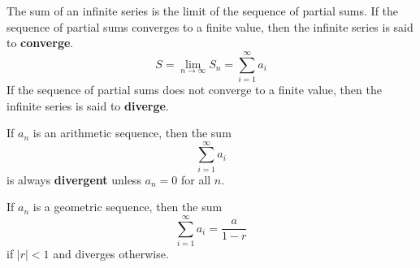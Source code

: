 \documentclass[addpoints]{exam}
\begin{document}
\begin{tcolorbox}[title=Definition: \textit{Sum of an Infinite Series},title filled,colframe=black,sharpish corners,width=\linewidth]
    The sum of an infinite series is the limit of the sequence of partial sums. If the sequence of partial sums converges to a finite value, then the infinite series is said to \textbf{converge}. 
    \begin{equation*}
        S=\lim_{n\to\infty}S_n=\sum_{i=1}^\infty a_i
    \end{equation*}
    If the sequence of partial sums does not converge to a finite value, then the infinite series is said to \textbf{diverge}.\\

    \noindent\begin{tcolorbox}[enhanced,title=Arithmetic,colback=white,
        colframe=black, colbacktitle=black,inherit height,width=.475\textwidth,attach boxed title to top center=
        {yshift=-3mm,yshifttext=-1mm},
        boxed title style={size=small,colback=gray},nobeforeafter]

        If $a_n$ is an arithmetic sequence, then the sum 
        \[\sum_{i=1}^\infty a_i\]
        is always \textbf{divergent} unless $a_n=0$ for all $n$.
    \end{tcolorbox}\hfill%
    \begin{tcolorbox}[enhanced,title=Geometric,colback=white,
        colframe=black,inherit height,width=.475\textwidth,attach boxed title to top center=
        {yshift=-3mm,yshifttext=-1mm},
        boxed title style={size=small,colback=gray},nobeforeafter]

        If $a_n$ is a geometric sequence, then the sum
        \[\sum_{i=1}^\infty a_i=\frac{a}{1-r}\]
        if $|r|<1$ and diverges otherwise.
    \end{tcolorbox}
\end{tcolorbox}
\end{document}
